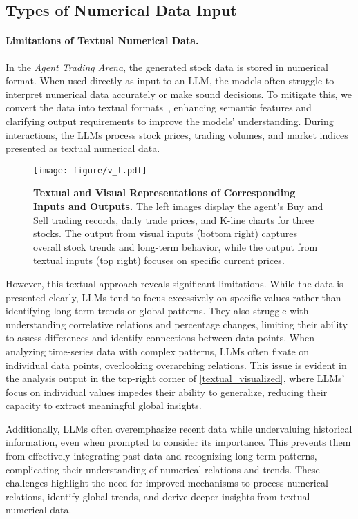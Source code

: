 \subsection{Types of Numerical Data Input}

\paragraph{Limitations of Textual Numerical Data.}

In the \textit{Agent Trading Arena}, the generated stock data is stored in numerical format. When used directly as input to an LLM, the models often struggle to interpret numerical data accurately or make sound decisions. To mitigate this, we convert the data into textual formats~\citep{numerical_text, long_text}, enhancing semantic features and clarifying output requirements to improve the models' understanding. During interactions, the LLMs process stock prices, trading volumes, and market indices presented as textual numerical data.

\begin{figure*}
	\centering
	\texttt{[image: figure/v\_t.pdf]}
	\caption{\textbf{Textual and Visual Representations of Corresponding Inputs and Outputs.} The left images display the agent’s Buy and Sell trading records, daily trade prices, and K-line charts for three stocks. The output from visual inputs (bottom right) captures overall stock trends and long-term behavior, while the output from textual inputs (top right) focuses on specific current prices.}
	\label{textual_visualized}
	\vspace{-3pt}
\end{figure*}

However, this textual approach reveals significant limitations. While the data is presented clearly, LLMs tend to focus excessively on specific values rather than identifying long-term trends or global patterns. They also struggle with understanding correlative relations and percentage changes, limiting their ability to assess differences and identify connections between data points. When analyzing time-series data with complex patterns, LLMs often fixate on individual data points, overlooking overarching relations. This issue is evident in the analysis output in the top-right corner of \autoref{textual_visualized}, where LLMs' focus on individual values impedes their ability to generalize, reducing their capacity to extract meaningful global insights.

Additionally, LLMs often overemphasize recent data while undervaluing historical information, even when prompted to consider its importance. This prevents them from effectively integrating past data and recognizing long-term patterns, complicating their understanding of numerical relations and trends. These challenges highlight the need for improved mechanisms to process numerical relations, identify global trends, and derive deeper insights from textual numerical data.

